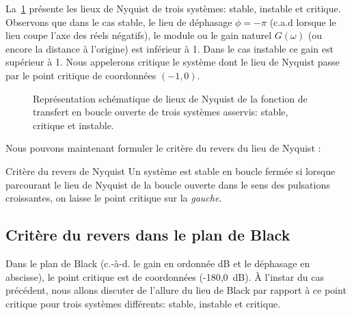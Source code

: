 La~\cref{fig-nyquist_revers} présente 
les lieux de Nyquist de trois systèmes: stable, instable et critique. Observons
que dans le cas stable, le lieu de déphasage $\phi=-\pi$ (c.a.d lorsque le lieu
coupe l'axe des réels négatifs), le module ou le gain naturel $G(\omega)$ (ou 
encore la distance à l'origine) est inférieur à 1. Dans le cas instable ce gain 
est supérieur à 1. Nous appelerons critique le système dont le lieu de Nyquist 
passe par le point critique de coordonnées $(-1,0)$.
\begin{figure}[!h]
    \centering
    
    \caption{Représentation schématique de lieux de Nyquist de la fonction 
             de transfert en boucle ouverte de trois systèmes asservis: 
             stable, critique et instable. \label{fig-nyquist_revers}}
\end{figure}

Nous pouvons maintenant formuler le critère du revers du lieu de Nyquist :
\begin{criteria}{Critère du revers de Nyquist}
    Un système est stable en boucle fermée si lorsque parcourant 
    le lieu de Nyquist de la boucle ouverte dans le sens des 
    pulsations croissantes, on laisse le point critique sur la 
    \emph{gauche}.
\end{criteria}
\subsection{Critère du revers dans le plan de Black
}
Dans le plan de Black (c.-à-d. le gain en ordonnée \si{\dB} et le déphasage
en abscisse), le point critique est de coordonnées (-180\degree,\SI{0}{\dB}).
À l'instar du cas précédent, nous allons discuter de l'allure du lieu de Black
par rapport à ce point critique pour trois systèmes différents:
stable, instable et critique.     

